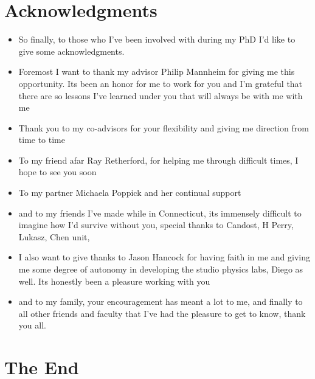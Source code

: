 \documentclass[10pt,letterpaper]{article}
\numberwithin{equation}{section}
\begin{document}

\section{Acknowledgments}
\begin{itemize}
	\item So finally, to those who I've been involved with during my PhD I'd like to give some acknowledgments.
	\item Foremost I want to thank my advisor Philip Mannheim for giving me this opportunity. Its been an honor for me to work for you and I'm grateful that there are so lessons I've learned under you that will always be with me with me
	\item Thank you to my co-advisors for your flexibility and giving me direction from time to time
	\item To my friend afar Ray Retherford, for helping me through difficult times, I hope to see you soon
	\item To my partner Michaela Poppick and her continual support
	\item and to my friends I've made while in Connecticut, its immensely difficult to imagine how I'd survive without you, special thanks to Candost, H Perry, Lukasz, Chen unit,
	\item I also want to give thanks to Jason Hancock for having faith in me and giving me some degree of autonomy in developing the studio physics labs, Diego as well. Its honestly been a pleasure working with you
	\item and to my family, your encouragement has meant a lot to me, and finally to all other friends and faculty that I've had the pleasure to get to know, thank you all. 
\end{itemize}


\section{The End}

\end{document}
